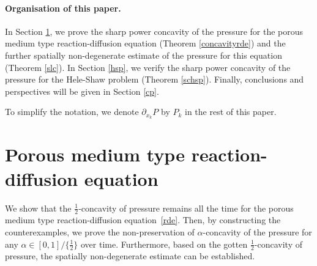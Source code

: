 \documentclass[10pt]{article}         %
\numberwithin{equation}{section}
\begin{document}
\paragraph{Organisation of this paper.} In Section \ref{rdpme}, we prove the sharp power concavity of the pressure for the porous medium type reaction-diffusion equation (Theorem \ref{concavityrde}) and the further spatially non-degenerate estimate of the pressure for this equation (Theorem \ref{slc}). In Section \ref{hsp}, we verify  the sharp power concavity of the pressure for the Hele-Shaw problem (Theorem \ref{schsp}). Finally, conclusions and perspectives will be given in Section \ref{cp}.

\vspace{2mm}

To simplify the notation, we denote $\partial_{x_k}P$ by $P_k$ in the rest of this paper.
\section{Porous medium type reaction-diffusion equation}\label{rdpme}
We show that the $\frac{1}{2}$-concavity of pressure remains all the time for the porous medium type reaction-diffusion equation~\eqref{rde}. Then, by constructing the counterexamples, we prove the non-preservation of $\alpha$-concavity of the pressure for any $\alpha\in [0,1]/\{\frac{1}{2}\}$ over time. Furthermore, based on the gotten $\frac{1}{2}$-concavity of pressure,  the spatially non-degenerate estimate can be established. 
\end{document}

